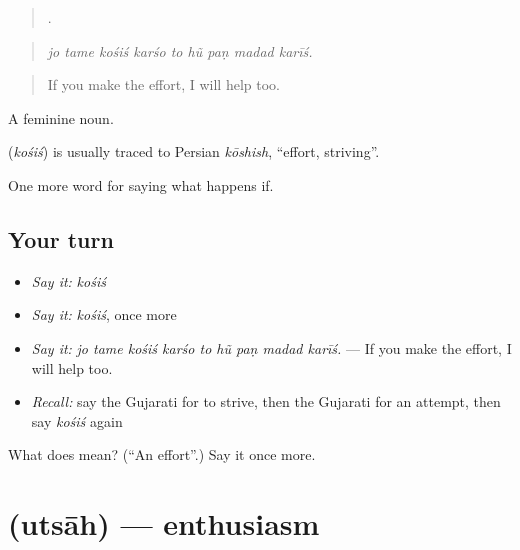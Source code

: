\begin{quote}
        .
\end{quote}

\begin{quote}
\emph{jo tame kośiś karśo to hũ paṇ madad karīś.}
\end{quote}

\begin{quote}
If you make the effort, I will help too.
\end{quote}

A feminine noun.

\begin{cousinweb}
\textbf{} (\emph{kośiś}) is usually traced to Persian \emph{kōshish}, \textquotedblleft{}effort, striving\textquotedblright{}.
\end{cousinweb}

\begin{grammarlens}[title={What you've built}]
One more word for saying what happens if.
\end{grammarlens}

\subsection*{Your turn}
\begin{itemize}
\raggedright
  \item \emph{Say it:} \emph{kośiś}
  \item \emph{Say it:} \emph{kośiś}, once more
  \item \emph{Say it:} \emph{jo tame kośiś karśo to hũ paṇ madad karīś.} — If you make the effort, I will help too.
  \item \emph{Recall:} say the Gujarati for to strive, then the Gujarati for an attempt, then say \emph{kośiś} again
\end{itemize}

\begin{tcolorbox}[breakable,colback=teal!4,colframe=teal!35!black,title={Before you move on}]
What does  mean? (\textquotedblleft{}An effort\textquotedblright{}.) Say it once more.
\end{tcolorbox}
\section[\texorpdfstring{\gu{ઉત્સાહ} (utsāh)}{ઉત્સાહ (utsāh)}]{ (utsāh) — enthusiasm}

